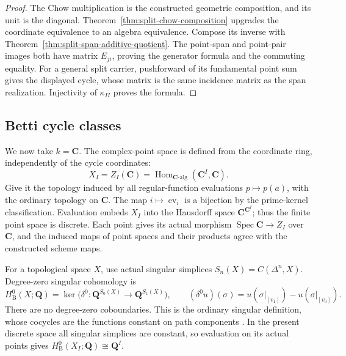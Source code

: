 \documentclass[11pt]{article}
\theoremstyle{definition}
\theoremstyle{remark}
\DeclareMathOperator{\Spec}{Spec}
\DeclareMathOperator{\ev}{ev}
\newcommand{\Q}{\mathbf Q}
\begin{document}
\begin{proof}
The Chow multiplication is the constructed geometric composition, and its
unit is the diagonal.  Theorem~\ref{thm:split-chow-composition} upgrades
the coordinate equivalence to an algebra equivalence.  Compose its inverse
with Theorem~\ref{thm:split-span-additive-quotient}.  The point-span and
point-pair images both have matrix \(E_{ji}\), proving the generator
formula and the commuting equality.
For a general split carrier, pushforward of its fundamental point sum
gives the displayed cycle, whose matrix is the same incidence matrix as
the span realization.  Injectivity of \(\kappa_{II}\) proves the formula.
\end{proof}

\subsection{Betti cycle classes}

We now take \(k=\mathbf C\).  The complex-point space is defined from the
coordinate ring, independently of the cycle coordinates:
\[
 X_I=Z_I(\mathbf C)
   =\operatorname{Hom}_{\mathbf C\text{-alg}}(\mathbf C^I,\mathbf C).
\]
Give it the topology induced by all regular-function evaluations
\(p\mapsto p(a)\), with the ordinary topology on \(\mathbf C\).
The map \(i\mapsto\ev_i\) is a bijection by the prime-kernel
classification.  Evaluation embeds \(X_I\) into the Hausdorff space
\(\mathbf C^{\mathbf C^I}\); thus the finite point space is discrete.
Each point gives its actual morphism \(\Spec\mathbf C\to Z_I\)
over \(\mathbf C\), and the induced maps of point spaces and their
products agree with the constructed scheme maps.

For a topological space \(X\), use actual singular simplices
\(S_n(X)=C(\Delta^n,X)\).  Degree-zero singular cohomology is
\[
 H^0_{\mathrm B}(X;\Q)
 =\ker\bigl(\delta^0:\Q^{S_0(X)}\longrightarrow\Q^{S_1(X)}\bigr),
 \qquad
 (\delta^0u)(\sigma)=u(\sigma|_{[v_1]})-u(\sigma|_{[v_0]}).
\]
There are no degree-zero coboundaries.  This is the ordinary singular
definition, whose cocycles are the functions constant on path components
\cite[\S3.1, p.~198]{HatcherAlgebraicTopology}.  In the present discrete
space all singular simplices are constant, so evaluation on its actual
points gives \(H^0_{\mathrm B}(X_I;\Q)\cong\Q^I\).
\end{document}
